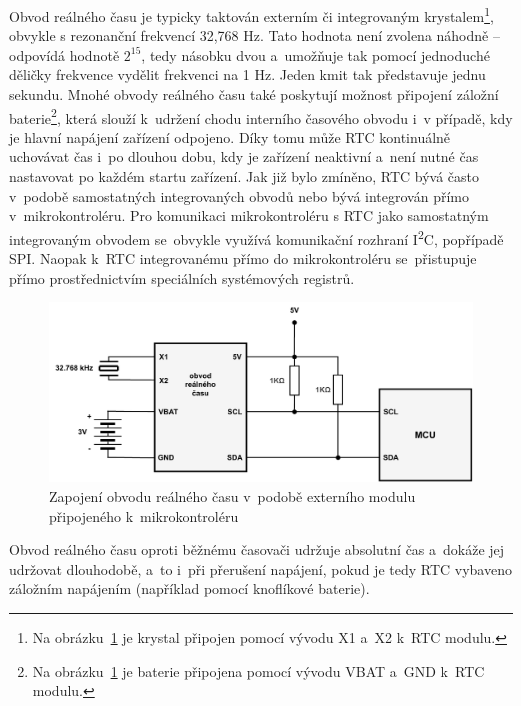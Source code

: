 Obvod reálného času je typicky taktován externím či integrovaným krystalem\footnote{Na obrázku~\ref{fig:real-time-circuit} je krystal připojen pomocí vývodu X1 a~X2 k~RTC modulu.}, obvykle s rezonanční frekvencí 32,768 Hz. Tato hodnota není zvolena náhodně – odpovídá hodnotě $2^{15}$, tedy násobku dvou a~umožňuje tak pomocí jednoduché děličky frekvence vydělit frekvenci na 1 Hz. Jeden kmit tak představuje jednu sekundu. Mnohé obvody reálného času také poskytují možnost připojení záložní baterie\footnote{Na obrázku~\ref{fig:real-time-circuit} je baterie připojena pomocí vývodu VBAT a~GND k~RTC modulu.}, která slouží k~udržení chodu interního časového obvodu i~v případě, kdy je hlavní napájení zařízení odpojeno. Díky tomu může RTC kontinuálně uchovávat čas i~po dlouhou dobu, kdy je zařízení neaktivní a~není nutné čas nastavovat po každém startu zařízení. Jak již bylo zmíněno, RTC bývá často v~podobě samostatných integrovaných obvodů nebo bývá integrován přímo v~mikrokontroléru. Pro komunikaci mikrokontroléru s RTC jako samostatným integrovaným obvodem se~obvykle využívá komunikační rozhraní I\textsuperscript{2}C, popřípadě SPI. Naopak k~RTC integrovanému přímo do mikrokontroléru se~přistupuje přímo prostřednictvím speciálních systémových registrů.~\cite{jameco_choosing_right_real_time_clock_chip_or_module, ti_rtc}

\begin{figure}[h]
    \centering
    \includegraphics[width=1.00\textwidth]{obrazky-figures/real_time_circuit.pdf}
    
    \caption{Zapojení obvodu reálného času v~podobě externího modulu připojeného k~mikrokontroléru~\cite{embed_journal_interfacing_rtc_with_microcontroler}}
    \label{fig:real-time-circuit}
\end{figure}

Obvod reálného času oproti běžnému časovači udržuje absolutní čas a~dokáže jej udržovat dlouhodobě, a~to i~při přerušení napájení, pokud je tedy RTC vybaveno záložním napájením (například pomocí knoflíkové baterie).

